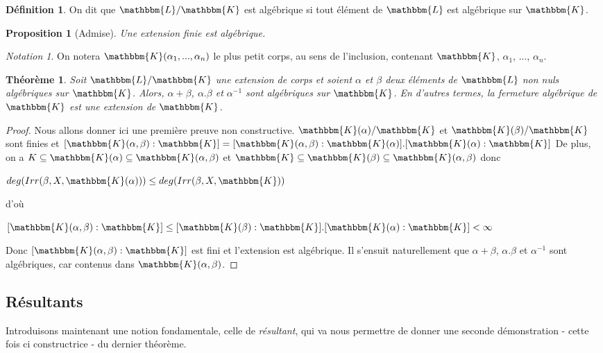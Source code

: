\documentclass[12pt]{article}
\newcommand{\jL}{\mathbbm{L}}
\newcommand{\K}{\mathbbm{K}}
\newtheorem{prop}{Proposition}
\newtheorem{thm}{Théorème}
\theoremstyle{definition}\newtheorem{defn}{Définition}
\theoremstyle{definition}\newtheorem{exm}{Exemple}
\theoremstyle{definition}\newtheorem{rem}{Remarque}
\theoremstyle{definition}\newtheorem{algo}{Algorithme}
\theoremstyle{remark}\newtheorem{exo}{Exercice}
\theoremstyle{remark}\newtheorem{nota}{Notation}
\begin{document}
\begin{defn}
On dit que $\jL / \K$ est algébrique si tout élément de $\jL$ est algébrique sur $\K$.
\end{defn}

\begin{prop}[Admise]
Une extension finie est algébrique.
\end{prop}

\begin{nota}
On notera $\K(\alpha_1, ..., \alpha_n)$ le plus petit corps, au sens de l'inclusion, contenant $\K$, $\alpha_1$, ..., $\alpha_n$.
\end{nota}

\begin{thm}
Soit $\jL/\K$ une extension de corps et soient $\alpha$ et $\beta$ deux éléments de $\jL$ non nuls algébriques sur $\K$. Alors, $\alpha + \beta$, $\alpha.\beta$ et $\alpha^{-1}$ sont algébriques sur $\K$. En d'autres termes, la fermeture algébrique de $\K$ est une extension de $\K$.
\end{thm}

\begin{proof}
Nous allons donner ici une première preuve non constructive. $\K(\alpha)/\K$ et $\K(\beta)/\K$ sont finies et $[\K(\alpha, \beta) : \K] = [\K(\alpha, \beta) : \K(\alpha)].[\K(\alpha) : \K]$ \newline
De plus, on a $K\subseteq \K(\alpha) \subseteq \K(\alpha,\beta)$ et $ \K\subseteq \K(\beta) \subseteq \K(\alpha,\beta)$ donc 
\begin{center}
$deg(Irr(\beta,X,\K(\alpha))) \le deg(Irr(\beta,X,\K))$
\end{center}
d'où 
\begin{center}
$[\K(\alpha,\beta) : \K] \le [\K(\beta) : \K].[\K(\alpha) : \K] < \infty$
\end{center}
Donc  $[\K(\alpha, \beta) : \K]$ est fini et l'extension est algébrique. Il s'ensuit naturellement que $\alpha + \beta$, $\alpha.\beta$ et $\alpha^{-1}$ sont algébriques, car contenus dans $\K(\alpha, \beta)$.
\end{proof}


\subsection{Résultants}

Introduisons maintenant une notion fondamentale, celle de \textit{résultant}, qui va nous permettre de donner une seconde démonstration - cette fois ci constructrice - du dernier théorème.
\end{document}
